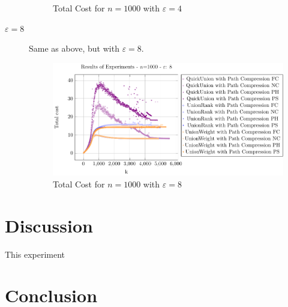\documentclass[10pt,a4paper,hidelinks]{article}
\begin{document}
\begin{description}
\begin{figure}[h!]
            \caption{Total Cost for $n = 1000$ with $\varepsilon = 4$}
        \end{figure}
    \item[$\varepsilon = 8$] Same as above, but with $\varepsilon = 8$.
        \begin{figure}[h!]
            \centering
            \includegraphics[width=\linewidth]{plots/plot_1000_Total_cost_epsilon_8.pdf}
            \caption{Total Cost for $n = 1000$ with $\varepsilon = 8$}
        \end{figure}
\end{description}

\section{Discussion}
This experiment
\section{Conclusion}


\newpage
\listoffigures
\lstlistoflistings
\listoftables
\end{document}
